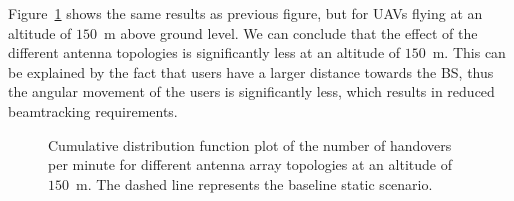 \documentclass[conference,twocolumn]{IEEEtran}
\begin{document}
% 
% 
\par Figure~\ref{fig:handovers150} shows the same results as previous figure, but for UAVs flying at an altitude of $150$~m above ground level. We can conclude that the effect of the different antenna topologies is significantly less at an altitude of $150$~m. This can be explained by the fact that users have a larger distance towards the BS, thus the angular movement of the users is significantly less, which results in reduced beamtracking requirements.

\begin{figure}[tbp]
\centering

\caption{Cumulative distribution function plot of the number of handovers per minute for different antenna array topologies at an altitude of $150$~m. The dashed line represents the baseline static scenario.}
\label{fig:handovers150}
\end{figure}
\end{document}
